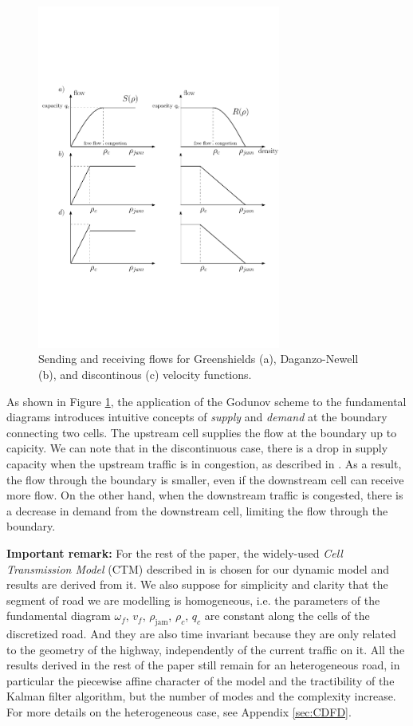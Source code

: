 \begin{figure}[ht]
  \centering
    \includegraphics[width=8cm]{figures/fundamentalDiagramSR.pdf}
    \caption{Sending and receiving flows for Greenshields (a), Daganzo-Newell (b), and discontinous (c) velocity functions.}
    \label{fig:fundamentalDiagramSR}
\end{figure}

\noindent As shown in Figure \ref{fig:fundamentalDiagramSR}, the application of the Godunov scheme to the fundamental diagrams introduces intuitive concepts of \textit{supply} and \textit{demand} at the boundary connecting two cells. The upstream cell supplies the flow at the boundary up to capicity. We can note that in the discontinuous case, there is a drop in supply capacity when the upstream traffic is in congestion, as described in \cite{Agyemang-Duah1991,Cassidy1999,Hall1991}. As a result, the flow through the boundary is smaller, even if the downstream cell can receive more flow. On the other hand, when the downstream traffic is congested, there is a decrease in demand from the downstream cell, limiting the flow through the boundary.

\hspace{10mm}

\noindent\textbf{Important remark:} For the rest of the paper, the widely-used \textit{Cell Transmission Model} (CTM) described in \cite{Daganzo1994} is chosen for our dynamic model and results are derived from it. We also suppose for simplicity and clarity that the segment of road we are modelling is homogeneous, i.e. the parameters of the fundamental diagram $\omega_{f}$, $v_{f}$, $\rho_{\text{jam}}$, $\rho_{c}$, $q_{c}$ are constant along the cells of the discretized road. And they are also time invariant because they are only related to the geometry of the highway, independently of the current traffic on it. All the results derived in the rest of the paper still remain for an heterogeneous road, in particular the piecewise affine character of the model and the tractibility of the Kalman filter algorithm, but the number of modes and the complexity increase. For more details on the heterogeneous case, see Appendix \ref{sec:CDFD}.


